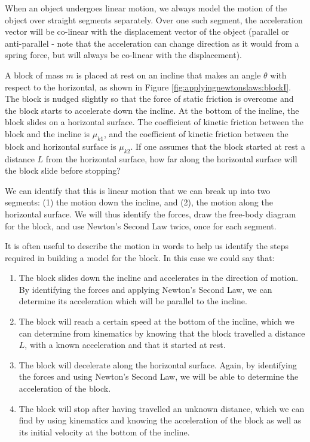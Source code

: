When an object undergoes linear motion, we always model the motion of the object over straight segments separately. Over one such segment, the acceleration vector will be co-linear with the displacement vector of the object (parallel or anti-parallel - note that the acceleration can change direction as it would from a spring force, but will always be co-linear with the displacement).

\begin{example}{\label{ex:applyingnewtonslaws:blockI}A block of mass $m$ is placed at rest on an incline that makes an angle $\theta$ with respect to the horizontal, as shown in Figure \ref{fig:applyingnewtonslaws:blockI}. The block is nudged slightly so that the force of static friction is overcome and the block starts to accelerate down the incline. At the bottom of the incline, the block slides on a horizontal surface. The coefficient of kinetic friction between the block and the incline is $\mu_{k1}$, and the coefficient of kinetic friction between the block and horizontal surface is $\mu_{k2}$. If one assumes that the block started at rest a distance $L$ from the horizontal surface, how far along the horizontal surface will the block slide before stopping?}


We can identify that this is linear motion that we can break up into two segments: (1) the motion down the incline, and (2), the motion along the horizontal surface. We will thus identify the forces, draw the free-body diagram for the block, and use Newton's Second Law twice, once for each segment.

It is often useful to describe the motion in words to help us identify the steps required in building a model for the block. In this case we could say that:
\begin{enumerate}
\item The block slides down the incline and accelerates in the direction of motion. By identifying the forces and applying Newton's Second Law, we can determine its acceleration which will be parallel to the incline.
\item The block will reach a certain speed at the bottom of the incline, which we can determine from kinematics by knowing that the block travelled a distance $L$, with a known acceleration and that it started at rest.
\item The block will decelerate along the horizontal surface. Again, by identifying the forces and using Newton's Second Law, we will be able to determine the acceleration of the block.
\item The block will stop after having travelled an unknown distance, which we can find by using kinematics and knowing the acceleration of the block as well as its initial velocity at the bottom of the incline.
\end{enumerate}


\end{example}
